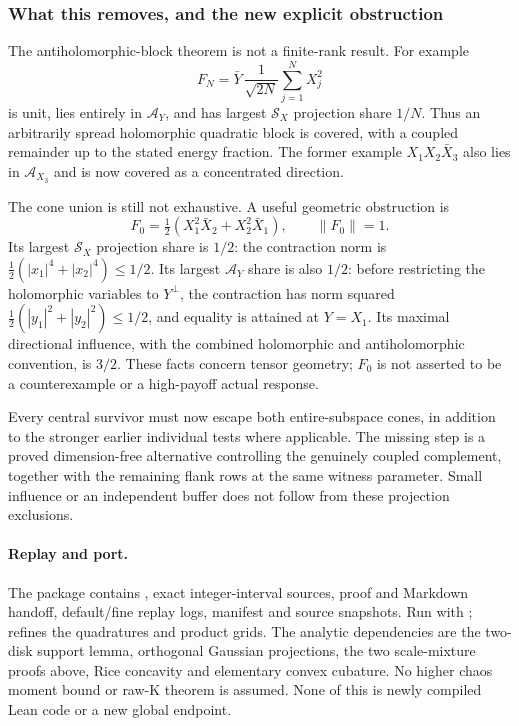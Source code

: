 \subsubsection{What this removes, and the new explicit obstruction}
The antiholomorphic-block theorem is not a finite-rank result.
For example
\[
 F_N=\bar Y\,\frac1{\sqrt{2N}}\sum_{j=1}^NX_j^2
\]
is unit, lies entirely in $\mathcal A_Y$, and has largest
$\mathcal S_X$ projection share $1/N$. Thus an arbitrarily spread
holomorphic quadratic block is covered, with a coupled remainder up
to the stated energy fraction. The former example
$X_1X_2\bar X_3$ also lies in $\mathcal A_{X_3}$ and is now covered
as a concentrated direction.

The cone union is still not exhaustive. A useful geometric obstruction is
\[
 F_0=\tfrac12(X_1^2\bar X_2+X_2^2\bar X_1),\qquad\|F_0\|=1.
\]
Its largest $\mathcal S_X$ projection share is $1/2$:
the contraction norm is
$\tfrac12(|x_1|^4+|x_2|^4)\le1/2$.
Its largest $\mathcal A_Y$ share is also $1/2$: before restricting
the holomorphic variables to $Y^\perp$, the contraction has norm
squared $\tfrac12(|y_1|^2+|y_2|^2)\le1/2$, and equality is attained
at $Y=X_1$. Its maximal directional influence, with the combined
holomorphic and antiholomorphic convention, is $3/2$.
These facts concern tensor geometry; $F_0$ is not asserted to be a
counterexample or a high-payoff actual response.

Every central survivor must now escape both entire-subspace cones,
in addition to the stronger earlier individual tests where applicable.
The missing step is a proved dimension-free alternative controlling
the genuinely coupled complement, together with the remaining flank
rows at the same witness parameter. Small influence or an independent
buffer does not follow from these projection exclusions.

\paragraph{Replay and port.}
The package  contains
, exact integer-interval sources, proof and
Markdown handoff, default/fine replay logs, manifest and source snapshots.
Run with ;
 refines the quadratures and product grids.
The analytic dependencies are the two-disk support lemma, orthogonal
Gaussian projections, the two scale-mixture proofs above, Rice
concavity and elementary convex cubature. No higher chaos moment
bound or raw-K theorem is assumed. None of this is newly compiled Lean
code or a new global endpoint.
